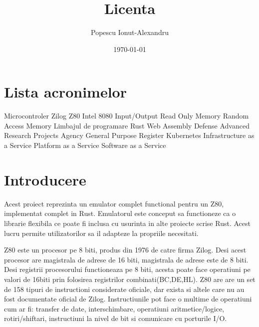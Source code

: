 \documentclass[titlepage,12pt]{article}
\begin{document}
    \title{Licenta}
    \author{Popescu Ionut-Alexandru}
    \date{\today}

    \maketitle
    \renewcommand{\contentsname}{Cuprins}
    \renewcommand{\listfigurename}{Lista figurilor}
    \renewcommand{\listtablename}{Lista tabelelor}
    \renewcommand{\figurename}{Figura}
    \renewcommand{\tablename}{Tabela}
    \renewcommand{\lstlistingname}{Cod}
    \tableofcontents
    \clearpage
    \listoffigures
    \clearpage
    \listoftables
    \clearpage
    \section*{Lista acronimelor} %
    \begin{acronym}
               {Microcontroler Zilog Z80}
             {Intel 8080}
                {Input/Output}
               {Read Only Memory}
               {Random Access Memory}
              {Limbajul de programare Rust}
              {Web Assembly}
             {Defense Advanced Research Projects Agency}
               {General Purpose Register}
               {Kubernetes}
              {Infrastructure as a Service}
              {Platform as a Service}
              {Software as a Service}
    \end{acronym}
    \clearpage


    \section{Introducere}
    Acest proiect reprezinta un emulator complet functional pentru un \ac {Z80}, implementat complet in \ac {Rust}.
    Emulatorul este conceput sa functioneze ca o librarie flexibila ce poate fi inclusa cu usurinta in alte proiecte scrise Rust. Acest lucru permite utilizatorilor sa il adapteze la propriile necesitati.

    \ac {Z80} este un procesor pe 8 biti, produs din 1976 de catre firma Zilog. Desi acest procesor are magistrala de adrese de 16 biti, magistrala de adrese este de 8 biti.
    Desi registrii procesorului functioneaza pe 8 biti, acesta poate face operatiuni pe valori de 16biti prin folosirea registrilor combinati(BC,DE,HL).
    Z80 are are un set de 158 tipuri de instructioni considerate oficiale, dar exista si altele care nu au fost documentate oficial de Zilog. Instructiunile pot face o multime de operatiuni cum ar fi: transfer de date, interschimbare, operatiuni aritmetice/logice, rotiri/shiftari, instructiuni la nivel de bit si comunicare cu porturile I/O.
\end{document}
